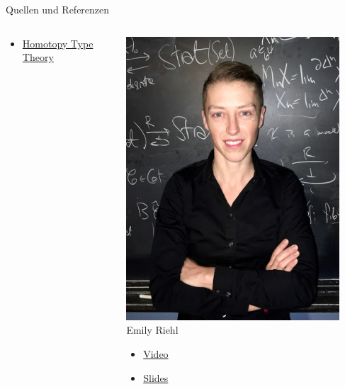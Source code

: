 \documentclass[11pt,aspectratio=169,notheorems]{beamer}
\begin{document}
\begin{frame}{Quellen und Referenzen}
\begin{columns}[T]
\begin{column}{.30\textwidth}
\begin{center}
{\begin{itemize}
                \item \href{https://www.youtube.com/watch?v=Ft8R3-kPDdk}{Homotopy Type Theory}
            \end{itemize}}
        \end{center}
        \end{column}%
        \hfill%
        \begin{column}{.30\textwidth}
        \begin{center}
            \includegraphics[width=0.9\textwidth]{images/riehl}\\[2pt]
            Emily Riehl
            \tiny{
            \begin{itemize}
                \item \href{http://www.math.jhu.edu/~eriehl/berkeley-logic.mp4}{Video}
                \item \href{http://www.math.jhu.edu/~eriehl/berkeley-logic.pdf}{Slides}
            \end{itemize}}
        \end{center}
        \end{column}%
    \end{columns}
\end{frame}
\end{document}
